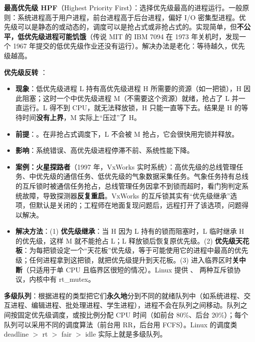 \textbf{最高优先级 HPF}（Highest Priority First）：选择优先级最高的进程运行。一般原则：系统进程高于用户进程，前台进程高于后台进程，偏好 I/O 密集型进程。优先级可以是静态的或动态的，调度可以是抢占式或非抢占式的。实现简单，但\textbf{不公平，低优先级进程可能饥饿}（传说 MIT 的 IBM 7094 在 1973 年关机时，发现一个 1967 年提交的低优先级作业还没有运行）。解决办法是老化：等待越久，优先级越高。

\textbf{优先级反转} \bk：
\begin{itemize}
    \item \textbf{现象}：低优先级进程 L 持有高优先级进程 H 所需要的资源（如一把锁），H 因此阻塞；这时一个中优先级进程 M（不需要这个资源）就绪，抢占了 L 并一直运行。L 得不到 CPU，就无法释放锁，H 只能一直等下去。结果是 H 的等待时间\textbf{没有上界}，M 实际上“压过”了 H。
    \item \textbf{前提}：。在非抢占式调度下，L 不会被 M 抢占，它会很快用完锁并释放。
    \item \textbf{影响}：系统错误、高优先级进程停滞不前、系统性能下降。
    \item \textbf{案例：火星探路者}（1997 年，VxWorks 实时系统）：高优先级的总线管理任务、中优先级的通信任务、低优先级的气象数据采集任务。气象任务持有总线的互斥锁时被通信任务抢占，总线管理任务因拿不到锁而超时，看门狗判定系统故障，导致探测器\textbf{反复重启}。VxWorks 的互斥锁其实有“优先级继承”选项，但默认是关闭的；工程师在地面复现问题后，远程打开了该选项，问题得以解决。
    \item \textbf{解决方法}：(1) \textbf{优先级继承}：当 H 因为 L 持有的锁而阻塞时，L 临时继承 H 的优先级，这样 M 就不能抢占 L；L 释放锁后恢复原优先级。(2) \textbf{优先级天花板}：为每把锁设定一个“天花板”优先级，等于可能使用它的进程中最高的优先级；任何进程拿到这把锁，就把优先级提升到天花板。(3) 进入临界区时\textbf{关中断}（只适用于单 CPU 且临界区很短的情况）。Linux 提供 、 两种互斥锁协议，内核中有 rt\_mutex。
\end{itemize}

\textbf{多级队列}：根据进程的类型把它们\textbf{永久地}分到不同的就绪队列中（如系统进程、交互进程、编辑进程、批处理进程、学生进程），进程不会在队列之间移动。队列之间按固定优先级调度，或按比例分配 CPU 时间（如前台 80\%、后台 20\%）；每个队列可以采用不同的调度算法（前台用 RR，后台用 FCFS）。Linux 的调度类 deadline $>$ rt $>$ fair $>$ idle 实际上就是多级队列。

